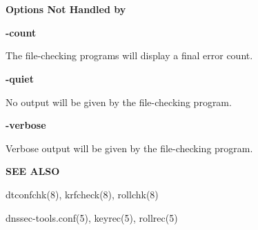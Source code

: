 {\bf Options Not Handled by }

\begin{description}

\item {\bf -count}\verb" "

The file-checking programs will display a final error count.

\item {\bf -quiet}\verb" "

No output will be given by the file-checking program.

\item {\bf -verbose}\verb" "

Verbose output will be given by the file-checking program.

\end{description}

{\bf SEE ALSO}

dtconfchk(8),
krfcheck(8),
rollchk(8)

dnssec-tools.conf(5),
keyrec(5),
rollrec(5)

